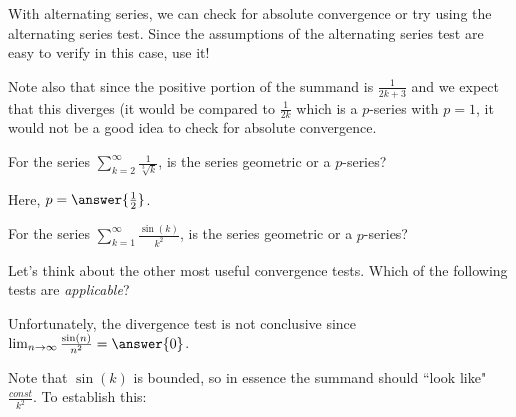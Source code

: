 \documentclass{ximera}
\begin{document}
\begin{exercise}
\begin{hint}
\begin{question}
With alternating series, we can check for absolute convergence or try using the alternating series test.  Since the assumptions of the alternating series test are easy to verify in this case, use it!

Note also that since the positive portion of the summand is $\frac{1}{2k+3}$ and we expect that this diverges (it would be compared to $\frac{1}{2k}$ which is a $p$-series with $p=1$, it would not be a good idea to check for absolute convergence.

\end{question}

\begin{question}
For the series $\sum_{k=2}^{\infty} \frac{1}{\sqrt[3]{k}}$, is the series geometric or a $p$-series?

\begin{multipleChoice}
\end{multipleChoice}

Here, $p= \answer{\frac{1}{2}}$. 
\end{question}

\begin{question}

For the series $\sum_{k=1}^{\infty} \frac{\sin(k)}{k^2}$, is the series geometric or a $p$-series?

\begin{multipleChoice}
\end{multipleChoice}

Let's think about the other most useful convergence tests.  Which of the following tests are \emph{applicable}?

\begin{selectAll}
\end{selectAll}

Unfortunately, the divergence test is not conclusive since $\lim_{n \to \infty} \frac{\sin(n)}{n^2} = \answer{0}$.  

Note that $\sin(k)$ is bounded, so in essence the summand should ``look like" $\frac{const}{k^2}$.  To establish this:


\end{question}
\end{hint}
\end{exercise}
\end{document}
